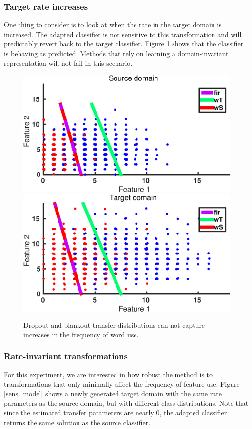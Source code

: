 \documentclass[twoside,11pt]{article}
\begin{document}
\subsubsection{Target rate increases}
One thing to consider is to look at when the rate in the target domain is increased. The adapted classifier is not sensitive to this transformation and will predictably revert back to the target classifier. Figure \ref{sens_rateinc} shows that the classifier is behaving as predicted. Methods that rely on learning a domain-invariant representation will not fail in this scenario.

\begin{figure}[ht]
	\centering
	\includegraphics[width=.48\textwidth]{images/da_artexp_rateinc_Poisson_s.eps}
	\includegraphics[width=.48\textwidth]{images/da_artexp_rateinc_Poisson_t.eps}
	\caption{Dropout and blankout transfer distributions can not capture increases in the frequency of word use.}
	\label{sens_rateinc}
\end{figure}

\subsubsection{Rate-invariant transformations}
For this experiment, we are interested in how robust the method is to transformations that only minimally affect the frequency of feature use. Figure \ref{sens_model} shows a newly generated target domain with the same rate parameters as the source domain, but with different class distributions. Note that since the estimated transfer parameters are nearly 0, the adapted classifier returns the same solution as the source classifier.
\end{document}
